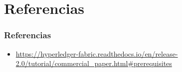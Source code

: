 \documentclass{beamer}
\begin{document}
	\section{Referencias}
	
	\begin{frame} [allowframebreaks]
		\frametitle{Referencias}
		\begin{itemize}
			\item \url{https://hyperledger-fabric.readthedocs.io/en/release-2.0/tutorial/commercial\_paper.html\#prerequisites}
		\end{itemize}
	\end{frame}
\end{document}
